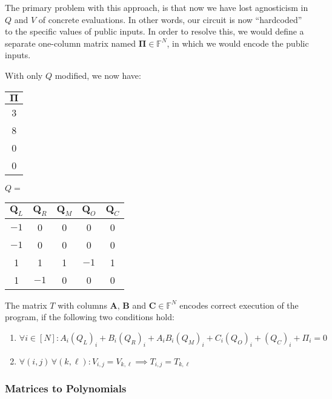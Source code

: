 \documentclass[../lecture-notes.tex]{subfiles}
\begin{document}
The primary problem with this approach, is that now we have lost agnosticism in
$Q$ and $V$ of concrete evaluations. In other words, our circuit is now
``hardcoded'' to the specific values of public inputs. In order to resolve this,
we would define a separate one-column matrix named $\boldsymbol{\Pi} \in \mathbb{F}^N$, in which
we would encode the public inputs.

\begin{example}
With only $Q$ modified, we now have:

\centering 
\begin{center}
\begin{tabular}{|c|}
\hline
\rowcolor{gray!30} $\boldsymbol{\Pi}$ \\ 
\hline
3 \\ 
\hline
8 \\ 
\hline
0 \\ 
\hline
0 \\ 
\hline
\end{tabular} \hspace{1cm}
$Q=$ 
\begin{tabular}{|c|c|c|c|c|}
\hline
\rowcolor{gray!30} $\mathbf{Q}_L$ & $\mathbf{Q}_R$ & $\mathbf{Q}_M$ & $\mathbf{Q}_O$ & $\mathbf{Q}_C$ \\ 
\hline
$-1$ & 0 & 0 & 0 & 0 \\ 
\hline
$-1$ & 0 & 0 & 0 & 0 \\ 
\hline
1 & 1 & 1 & $-1$ & 1 \\ 
\hline
1 & $-1$ & 0 & 0 & 0 \\ 
\hline
\end{tabular}
\end{center}
\end{example}

\begin{proposition}[Wrap-up]\label{prop:plonk-conditions}
The matrix $T$ with columns $\mathbf{A}$, $\mathbf{B}$ and $\mathbf{C} \in \mathbb{F}^N$ encodes correct execution of the program, if the following two conditions hold:
\begin{enumerate}
    \item \(\forall i \in [N]: A_i (Q_{L})_i + B_i(Q_{R})_i + A_i B_i (Q_{M})_i + C_i (Q_{O})_i + (Q_{C})_i + \Pi_i = 0\)
    \item \(\forall (i, j) \, \forall (k, \ell): V_{i,j} = V_{k,\ell} \implies T_{i,j} = T_{k,\ell}\)
\end{enumerate}
\end{proposition}

\subsubsection{Matrices to Polynomials}
\end{document}
